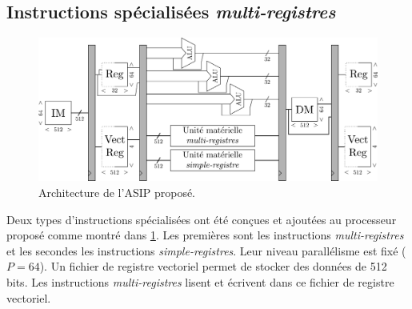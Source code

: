 


\subsection{Instructions spécialisées \textit{multi-registres}}
\begin{figure}
\centering
\includegraphics[width=\textwidth]{main/ch3_fig/full_tensilica}
\caption{Architecture de l'ASIP proposé.}
\label{fig:full_tensilica}
\end{figure}

Deux types d'instructions spécialisées ont été conçues et ajoutées au processeur proposé comme montré dans \ref{fig:full_tensilica}. Les premières sont les instructions \textit{multi-registres} et les secondes les instructions \textit{simple-registres}. Leur niveau parallélisme est fixé ($P=64$). Un fichier de registre vectoriel permet de stocker des données de 512 bits. Les instructions \textit{multi-registres} lisent et écrivent dans ce fichier de registre vectoriel.

